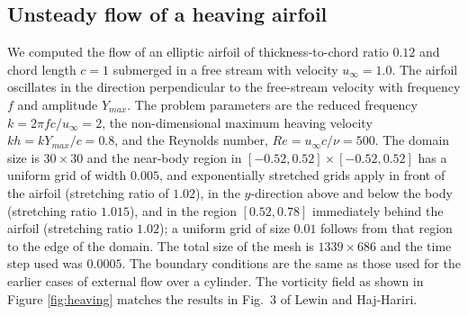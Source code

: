 \documentclass{tufte-handout}
\begin{document}
\subsection{\large Unsteady flow of a heaving airfoil}

We computed the flow of an elliptic airfoil of thickness-to-chord ratio $0.12$ and chord length $c=1$ submerged in a   free stream with velocity $u_\infty=1.0$. The airfoil oscillates in the direction perpendicular to the free-stream velocity with frequency $f$ and amplitude $Y_{max}$. 
The problem parameters are the reduced frequency $k={2{\pi}{f}{c}}/{u_\infty}=2$, the non-dimensional maximum heaving velocity $kh={k}{Y_{max}}/{c}=0.8$, and the Reynolds number, $Re={u_\infty}c/{\nu}=500$. The domain size is $30 \times30$ and the near-body region in $[-0.52,0.52]\times[-0.52,0.52]$ has a uniform grid of width $0.005$, and exponentially stretched grids apply in front of the airfoil (stretching ratio of $1.02$), in the $y$-direction above and below the body (stretching ratio $1.015$), and in the region $[0.52,0.78]$ immediately behind the airfoil (stretching ratio $1.02$); a uniform grid of size $0.01$ follows from that region to the edge of the domain. The total size of the mesh is $1339\times{686}$ and the time step used was $0.0005$. The boundary conditions are the same as those used for the earlier cases of external flow over a cylinder. The vorticity field as shown in Figure \ref{fig:heaving} matches the results in Fig.~3 of Lewin and Haj-Hariri.
\end{document}
